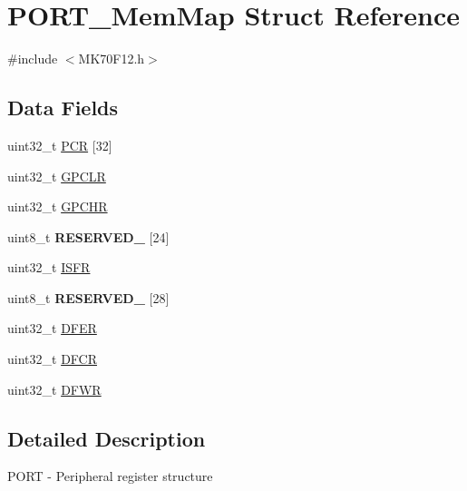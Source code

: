 \hypertarget{struct_p_o_r_t___mem_map}{}\section{P\+O\+R\+T\+\_\+\+Mem\+Map Struct Reference}
\label{struct_p_o_r_t___mem_map}


{\ttfamily \#include $<$M\+K70\+F12.\+h$>$}

\subsection*{Data Fields}
\begin{DoxyCompactItemize}
\item 
uint32\+\_\+t \hyperlink{struct_p_o_r_t___mem_map_a1c54a8f1741fade8daf28198fee43ddd}{P\+C\+R} \mbox{[}32\mbox{]}
\item 
uint32\+\_\+t \hyperlink{struct_p_o_r_t___mem_map_a837c289643f8cec958b1f01c086b558a}{G\+P\+C\+L\+R}
\item 
uint32\+\_\+t \hyperlink{struct_p_o_r_t___mem_map_a84f8893cbefd6a3eff18b455f9069b29}{G\+P\+C\+H\+R}
\item 
\hypertarget{struct_p_o_r_t___mem_map_ad85e48d2b0e879333bf0dcb5a0af21f5}{}uint8\+\_\+t {\bfseries R\+E\+S\+E\+R\+V\+E\+D\+\_} \mbox{[}24\mbox{]}\label{struct_p_o_r_t___mem_map_ad85e48d2b0e879333bf0dcb5a0af21f5}

\item 
uint32\+\_\+t \hyperlink{struct_p_o_r_t___mem_map_a53c86a08f430dc915a312efe74ba83e6}{I\+S\+F\+R}
\item 
\hypertarget{struct_p_o_r_t___mem_map_acf6fba14d96a0e52de37d90eb15c0324}{}uint8\+\_\+t {\bfseries R\+E\+S\+E\+R\+V\+E\+D\+\_} \mbox{[}28\mbox{]}\label{struct_p_o_r_t___mem_map_acf6fba14d96a0e52de37d90eb15c0324}

\item 
uint32\+\_\+t \hyperlink{struct_p_o_r_t___mem_map_ad472de7afdaeef3985761041fe9023e2}{D\+F\+E\+R}
\item 
uint32\+\_\+t \hyperlink{struct_p_o_r_t___mem_map_a0d2552c73fb3c6ed5f336d7df1249151}{D\+F\+C\+R}
\item 
uint32\+\_\+t \hyperlink{struct_p_o_r_t___mem_map_a739d09875cabb44276b89977d36a19ed}{D\+F\+W\+R}
\end{DoxyCompactItemize}


\subsection{Detailed Description}
P\+O\+R\+T -\/ Peripheral register structure 

